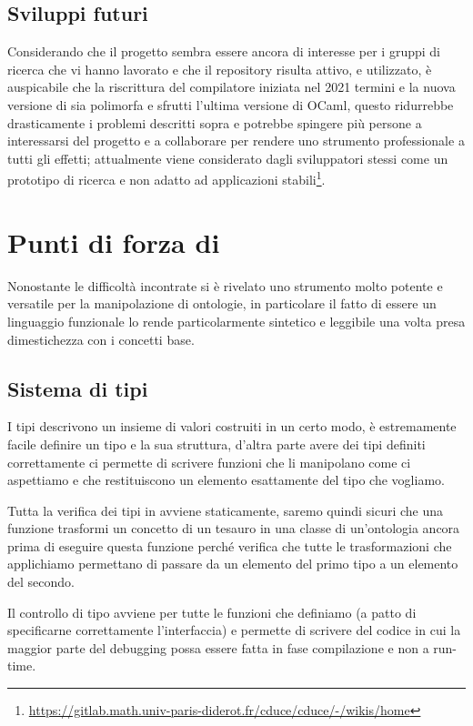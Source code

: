 \subsection{Sviluppi futuri}
Considerando che il progetto sembra essere ancora di interesse per i gruppi di ricerca che vi hanno lavorato e che il repository risulta attivo, e utilizzato, è auspicabile che la riscrittura del compilatore iniziata nel 2021 termini e la nuova versione di \cduce sia polimorfa e sfrutti l'ultima versione di OCaml, questo ridurrebbe drasticamente i problemi descritti sopra e potrebbe spingere più persone a interessarsi del progetto e a collaborare per rendere \cduce uno strumento professionale a tutti gli effetti; attualmente \cduce viene considerato dagli sviluppatori stessi come un prototipo di ricerca e non adatto ad applicazioni stabili\footnote{\url{https://gitlab.math.univ-paris-diderot.fr/cduce/cduce/-/wikis/home}}.
\section{Punti di forza di \cduce}
Nonostante le difficoltà incontrate \cduce si è rivelato uno strumento molto potente e versatile per la manipolazione di ontologie, in particolare il fatto di essere un linguaggio funzionale lo rende particolarmente sintetico e leggibile una volta presa dimestichezza con i concetti base.
\subsection{Sistema di tipi}
I tipi descrivono un insieme di valori costruiti in un certo modo, è estremamente facile definire un tipo e la sua struttura, d'altra parte avere dei tipi definiti correttamente ci permette di scrivere funzioni che li manipolano come ci aspettiamo e che restituiscono un elemento esattamente del tipo che vogliamo.

Tutta la verifica dei tipi in \cduce avviene staticamente, saremo quindi sicuri che una funzione trasformi un concetto di un tesauro in una classe di un'ontologia ancora prima di eseguire questa funzione perché \cduce verifica che tutte le trasformazioni che applichiamo permettano di passare da un elemento del primo tipo a un elemento del secondo.

Il controllo di tipo avviene per tutte le funzioni che definiamo (a patto di specificarne correttamente l'interfaccia) e permette di scrivere del codice in cui la maggior parte del debugging possa essere fatta in fase compilazione e non a run-time. 

